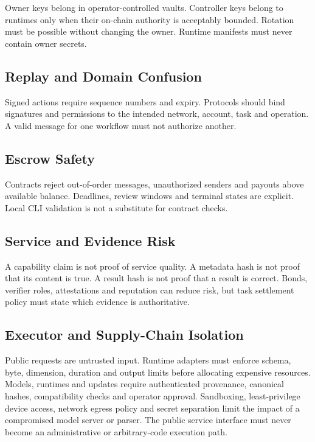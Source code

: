 \documentclass[11pt,oneside]{article}
\begin{document}
Owner keys belong in operator-controlled vaults. Controller keys belong to runtimes only when
their on-chain authority is acceptably bounded. Rotation must be possible without changing
the owner. Runtime manifests must never contain owner secrets.

\subsection{Replay and Domain Confusion}

Signed actions require sequence numbers and expiry. Protocols should bind signatures and
permissions to the intended network, account, task and operation. A valid message for one
workflow must not authorize another.

\subsection{Escrow Safety}

Contracts reject out-of-order messages, unauthorized senders and payouts above available
balance. Deadlines, review windows and terminal states are explicit. Local CLI validation is
not a substitute for contract checks.

\subsection{Service and Evidence Risk}

A capability claim is not proof of service quality. A metadata hash is not proof that its
content is true. A result hash is not proof that a result is correct. Bonds, verifier roles,
attestations and reputation can reduce risk, but task settlement policy must state which
evidence is authoritative.

\subsection{Executor and Supply-Chain Isolation}

Public requests are untrusted input. Runtime adapters must enforce schema, byte, dimension,
duration and output limits before allocating expensive resources. Models, runtimes and
updates require authenticated provenance, canonical hashes, compatibility checks and
operator approval. Sandboxing, least-privilege device access, network egress policy and
secret separation limit the impact of a compromised model server or parser. The public
service interface must never become an administrative or arbitrary-code execution path.
\end{document}
